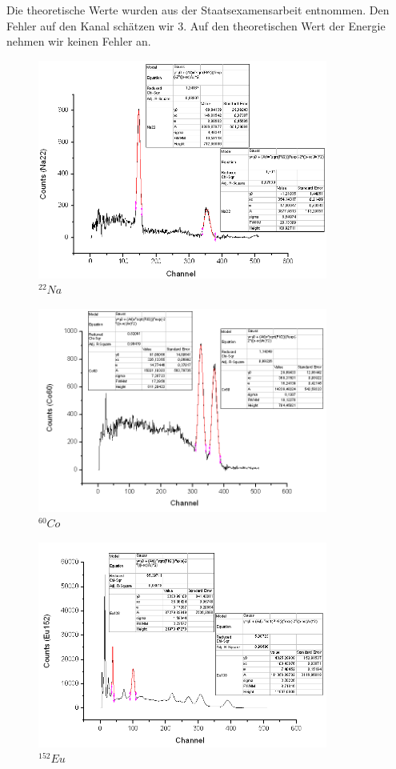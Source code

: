 Die theoretische Werte wurden aus der Staatsexamensarbeit entnommen. Den Fehler auf den Kanal schätzen wir 3. Auf den theoretischen Wert der Energie nehmen wir keinen Fehler an.

\begin{figure}[H]
\centering \includegraphics[width = 0.85\textwidth]{auswertung/Na22.png}
\caption{$^{22}Na$}
\end{figure}

\begin{figure}[H]
\centering \includegraphics[width = 0.85\textwidth]{auswertung/Co60.png}
\caption{$^{60}Co$}
\end{figure}

\begin{figure}[H]
\centering \includegraphics[width = 0.85\textwidth]{auswertung/Eu152.png}
\caption{$^{152}Eu$}
\end{figure}


